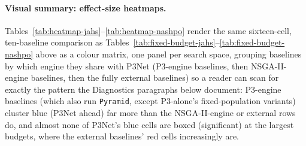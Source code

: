 \paragraph{Visual summary: effect-size heatmaps.} Tables~\ref{tab:heatmap-jahs}--\ref{tab:heatmap-nashpo}
render the same sixteen-cell, ten-baseline comparison as
Tables~\ref{tab:fixed-budget-jahs}--\ref{tab:fixed-budget-nashpo} above as a colour matrix, one panel per
search space, grouping baselines by which engine they share with P3Net (P3-engine baselines, then
NSGA-II-engine baselines, then the fully external baselines) so a reader can scan for exactly the pattern the
Diagnostics paragraphs below document: P3-engine baselines (which also run \texttt{Pyramid}, except
P3-alone's fixed-population variants) cluster blue (P3Net ahead) far more than the NSGA-II-engine or external
rows do, and almost none of P3Net's blue cells are boxed (significant) at the largest budgets, where the
external baselines' red cells increasingly are.

